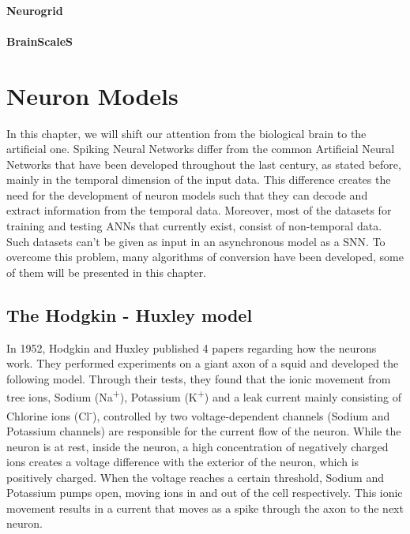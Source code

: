 \documentclass[12pt]{report}
\begin{document}
\subsubsection{Neurogrid}

\subsubsection{BrainScaleS}


\chapter{Neuron Models}
In this chapter, we will shift our attention from the biological brain to the artificial one. Spiking Neural Networks differ from the common Artificial Neural Networks that have been developed throughout the last century, as stated before, mainly in the temporal dimension of the input data. This difference creates the need for the development of neuron models such that they can decode and extract information from the temporal data. Moreover, most of the datasets for training and testing ANNs that currently exist, consist of non-temporal data. Such datasets can't be given as input in an asynchronous model as a SNN. To overcome this problem, many algorithms of conversion have been developed, some of them will be presented in this chapter.

\section{The Hodgkin - Huxley model}
In 1952, Hodgkin and Huxley published 4 papers regarding how the neurons work\cite{Johnson2017}. They performed experiments on a giant axon of a squid and developed the following model. Through their tests, they found that the ionic movement from tree ions, Sodium (Na\textsuperscript{+}), Potassium (K\textsuperscript{+}) and a leak current mainly consisting of Chlorine ions (Cl\textsuperscript{-}), controlled by two voltage-dependent channels (Sodium and Potassium channels) are responsible for the current flow of the neuron. While the neuron is at rest, inside the neuron, a high concentration of negatively charged ions creates a voltage difference with the exterior of the neuron, which is positively charged. When the voltage reaches a certain threshold, Sodium and Potassium pumps open, moving ions in and out of the cell respectively. This ionic movement results in a current that moves as a spike through the axon to the next neuron.
\end{document}
